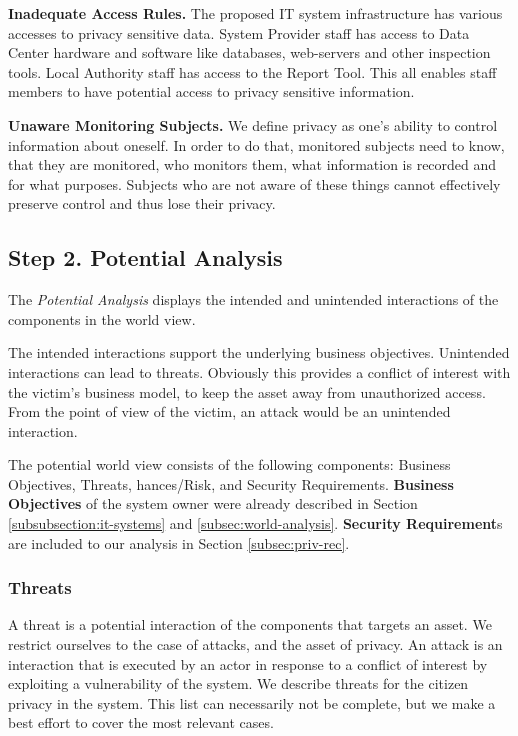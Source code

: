 \documentclass[runningheads,a4paper]{llncs}
\begin{document}
\textbf{Inadequate Access Rules.}
The proposed IT system infrastructure has various accesses to privacy sensitive data.
System Provider staff has access to Data Center hardware and software like databases, web-servers and other inspection tools. Local Authority staff has access to the Report Tool. This all enables staff members to have potential access to privacy sensitive information.


\textbf{Unaware Monitoring Subjects.}
We define privacy as one's ability to control information about
oneself.  In order to do that, monitored subjects need to know, that
they are monitored, who monitors them, what information is recorded
and for what purposes.  Subjects who are not aware of these things
cannot effectively preserve control and thus lose their privacy. 

\subsection{Step 2. Potential Analysis}
\label{subsec:pot-analysis}

The \emph{Potential Analysis} displays the intended and unintended interactions of the components in the world view.

The intended interactions support the underlying business objectives. Unintended interactions can lead to threats. Obviously this provides a conflict of interest with the victim's business model, to keep the asset away from unauthorized access. From the point of view of the victim, an attack would be an unintended interaction.

The potential world view consists of the following components: Business Objectives, Threats, hances/Risk, and Security Requirements. 
\textbf{Business Objectives} of the system owner were already described in Section \ref{subsubsection:it-systems} and \ref{subsec:world-analysis}. \textbf{Security Requirement}s are included to our analysis in Section \ref{subsec:priv-rec}.


\subsubsection{Threats}

A threat is a potential interaction of the components that targets an asset.
We restrict ourselves to the case of attacks, and the asset of privacy.
An attack is an interaction that is executed by an actor in response to a conflict of interest by exploiting a vulnerability of the system. We describe threats for the citizen privacy in the system.
This list can necessarily not be complete, but we make a best effort to cover the most relevant cases.
\end{document}

